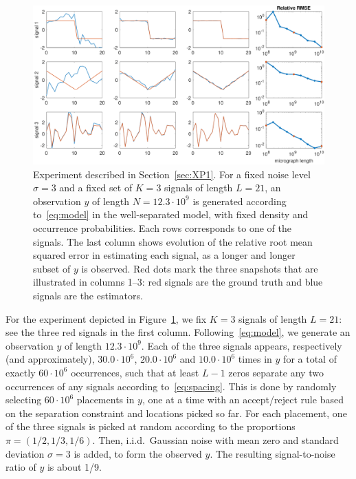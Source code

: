 \documentclass[12pt]{article}
\newcommand{\1}{\mathbf{1}}
\theoremstyle{plain}
\theoremstyle{definition}
\theoremstyle{remark}
\theoremstyle{plain}
\theoremstyle{remark}
\theoremstyle{plain}
\theoremstyle{plain}
\theoremstyle{plain}
\numberwithin{equation}{section}
\begin{document}
\begin{figure}[t]
	\centering
	\includegraphics[width=1\linewidth]{heterogeneous_progressive_n12300000000_466300}
	\caption{Experiment described in Section~\ref{sec:XP1}. For a fixed noise level $\sigma = 3$ and a fixed set of $K = 3$ signals of length $L = 21$, an observation $y$ of length $N = 12.3 \cdot 10^9$ is generated according to~\eqref{eq:model} in the well-separated model, with fixed density and occurrence probabilities. Each rows corresponds to one of the signals. The last column shows evolution of the relative root mean squared error in estimating each signal, as a longer and longer subset of $y$ is observed. Red dots mark the three snapshots that are illustrated in columns 1--3: red signals are the ground truth and blue signals are the estimators.}
	\label{fig:1Dheterosignals}
\end{figure}

For the experiment depicted in Figure~\ref{fig:1Dheterosignals}, we fix $K = 3$ signals of length $L = 21$: see the three red signals in the first column. Following~\eqref{eq:model}, we generate an observation $y$ of length $12.3 \cdot 10^9$. Each of the three signals appears, respectively (and approximately), $30.0 \cdot 10^6$, $20.0 \cdot 10^6$ and $10.0 \cdot 10^6$ times in $y$ for a total of exactly $60 \cdot 10^6$ occurrences, such that at least $L-1$ zeros separate any two occurrences of any signals according to~\eqref{eq:spacing}. This is done by randomly selecting $60 \cdot 10^6$ placements in $y$, one at a time with an accept/reject rule based on the separation constraint and locations picked so far. For each placement, one of the three signals is picked at random according to the proportions $\pi = (1/2, 1/3, 1/6)$. Then, i.i.d.\ Gaussian noise with mean zero and standard deviation $\sigma = 3$ is added, to form the observed $y$. The resulting signal-to-noise ratio of $y$
is about 1/9.
\end{document}
